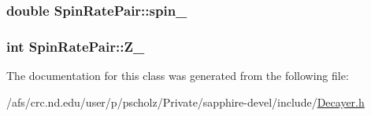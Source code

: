 \hypertarget{classSpinRatePair_ab52ca1bd083db60ceaf8fe58b4647669}{
\subsubsection[{spin\-\_\-}]{\setlength{\rightskip}{0pt plus 5cm}double Spin\-Rate\-Pair\-::spin\-\_\-}}\label{classSpinRatePair_ab52ca1bd083db60ceaf8fe58b4647669}
\hypertarget{classSpinRatePair_abcfea082d53a68d433b3deac710f1731}{
\subsubsection[{Z\-\_\-}]{\setlength{\rightskip}{0pt plus 5cm}int Spin\-Rate\-Pair\-::\-Z\-\_\-}}\label{classSpinRatePair_abcfea082d53a68d433b3deac710f1731}


The documentation for this class was generated from the following file\-:\begin{DoxyCompactItemize}
\item 
/afs/crc.\-nd.\-edu/user/p/pscholz/\-Private/sapphire-\/devel/include/\hyperlink{Decayer_8h}{Decayer.\-h}\end{DoxyCompactItemize}
